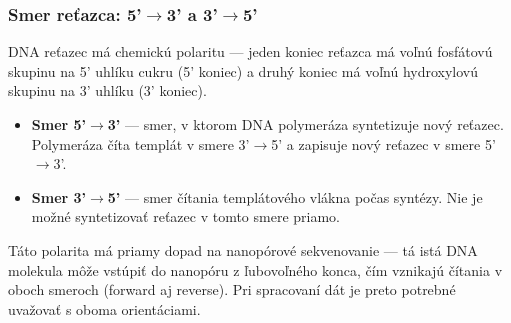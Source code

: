 \subsubsection{Smer reťazca: 5'$\rightarrow$3' a 3'$\rightarrow$5'}
DNA reťazec má chemickú polaritu --- jeden koniec reťazca má voľnú fosfátovú skupinu na 5' uhlíku cukru (5' koniec) a druhý koniec má voľnú hydroxylovú skupinu na 3' uhlíku (3' koniec).

\begin{itemize}
    \item \textbf{Smer 5'$\rightarrow$3'} --- smer, v ktorom DNA polymeráza syntetizuje nový reťazec. Polymeráza číta templát v smere 3'$\rightarrow$5' a zapisuje nový reťazec v smere 5'$\rightarrow$3'.
    \item \textbf{Smer 3'$\rightarrow$5'} --- smer čítania templátového vlákna počas syntézy. Nie je možné syntetizovať reťazec v tomto smere priamo.
\end{itemize}

Táto polarita má priamy dopad na nanopórové sekvenovanie --- tá istá DNA molekula môže vstúpiť do nanopóru z ľubovoľného konca, čím vznikajú čítania v oboch smeroch (forward aj reverse). Pri spracovaní dát je preto potrebné uvažovať s oboma orientáciami.
